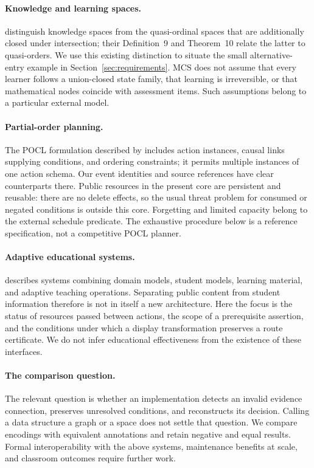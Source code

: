 \documentclass[11pt,a4paper]{article}
\theoremstyle{remark}
\begin{document}
\paragraph{Knowledge and learning spaces.}
\citet{spaces} distinguish knowledge spaces from the quasi-ordinal spaces that
are additionally closed under intersection; their Definition~9 and Theorem~10
relate the latter to quasi-orders. We use this existing distinction to situate
the small alternative-entry example in Section~\ref{sec:requirements}.
MCS does not assume that every learner follows a union-closed state family,
that learning is irreversible, or that mathematical nodes coincide with
assessment items. Such assumptions belong to a particular external model.

\paragraph{Partial-order planning.}
The POCL formulation described by \citet{vhpop} includes action instances, causal
links supplying conditions, and ordering constraints; it permits multiple
instances of one action schema. Our event identities and source references have
clear counterparts there. Public resources in the present core are persistent
and reusable: there are no delete effects, so the usual threat problem for
consumed or negated conditions is outside this core. Forgetting and limited
capacity belong to the external schedule predicate. The exhaustive procedure
below is a reference specification, not a competitive POCL planner.

\paragraph{Adaptive educational systems.}
\citet{brusilovsky} describes systems combining domain models, student models,
learning material, and adaptive teaching operations. Separating public content
from student information therefore is not in itself a new architecture.
Here the focus is the status of resources passed between actions,
the scope of a prerequisite assertion, and the conditions under which a
display transformation preserves a route certificate. We do not infer
educational effectiveness from the existence of these interfaces.

\paragraph{The comparison question.}
The relevant question is whether an implementation detects an invalid evidence
connection, preserves unresolved conditions, and reconstructs its decision.
Calling a data structure a graph or a space does not settle that question.
We compare encodings with equivalent annotations and retain negative and equal
results. Formal interoperability with the above systems,
maintenance benefits at scale, and classroom outcomes require further work.
\end{document}
